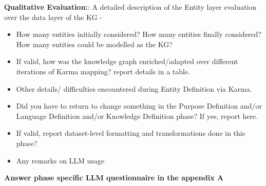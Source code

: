 \noident \textbf{Qualitative Evaluation:}: A detailed description of the Entity layer evaluation over the data layer of the KG -
\begin{itemize}
    \item How many entities initially considered? How many entities finally considered? How many entities could be modelled as the KG?
    \item If valid, how was the knowledge graph enriched/adapted over different iterations of Karma mapping? report details in a table.
    \item Other details/ difficulties encountered during Entity Definition via Karma.
    \item Did you have to return to change something in the Purpose Definition and/or Language Definition and/or Knowledge Definition phase? If yes, report here.
    \item If valid, report dataset-level formatting and transformations done in this phase?
    \item Any remarks on LLM usage
\end{itemize}

\noident \textbf{Answer phase specific LLM questionnaire in the appendix A}